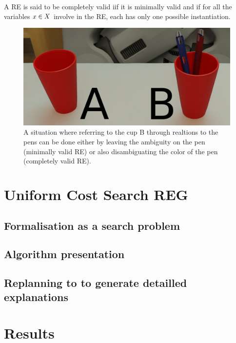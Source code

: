 \begin{theorem} 
\label{the:re_validity}
A RE is said to be completely valid iif it is minimally valid and if for all the variables $x \in X$ involve in the RE, each has only one possible instantiation.
\end{theorem}

\begin{figure}[h!]
\centering
\includegraphics[scale=0.15]{figures/chapter4/complet_validity.png}
\caption{\label{fig:chap4_complet} A situation where referring to the cup B through realtions to the pens can be done either by leaving the ambiguity on the pen (minimally valid RE) or also disambiguating the color of the pen (completely valid RE). }
\end{figure}

\section{Uniform Cost Search REG}

\subsection{Formalisation as a search problem}

\subsection{Algorithm presentation}

\subsection{Replanning to to generate detailled explanations}

\section{Results}

